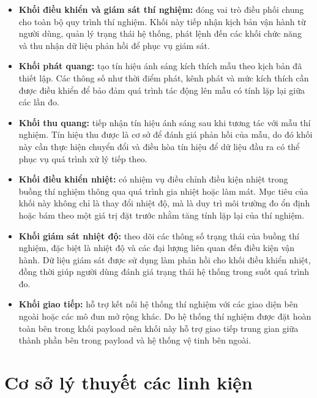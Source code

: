 \begin{itemize}
    \item \textbf{Khối điều khiển và giám sát thí nghiệm:} đóng vai trò điều phối chung cho toàn bộ quy trình thí nghiệm. Khối này tiếp nhận kịch bản vận hành từ người dùng, quản lý trạng thái hệ thống, phát lệnh đến các khối chức năng và thu nhận dữ liệu phản hồi để phục vụ giám sát.

    \item \textbf{Khối phát quang:} tạo tín hiệu ánh sáng kích thích mẫu theo kịch bản đã thiết lập. Các thông số như thời điểm phát, kênh phát và mức kích thích cần được điều khiển để bảo đảm quá trình tác động lên mẫu có tính lặp lại giữa các lần đo.

    \item \textbf{Khối thu quang:} tiếp nhận tín hiệu ánh sáng sau khi tương tác với mẫu thí nghiệm. Tín hiệu thu được là cơ sở để đánh giá phản hồi của mẫu, do đó khối này cần thực hiện chuyển đổi và điều hòa tín hiệu để dữ liệu đầu ra có thể phục vụ quá trình xử lý tiếp theo.

    \item \textbf{Khối điều khiển nhiệt:} có nhiệm vụ điều chỉnh điều kiện nhiệt trong buồng thí nghiệm thông qua quá trình gia nhiệt hoặc làm mát. Mục tiêu của khối này không chỉ là thay đổi nhiệt độ, mà là duy trì môi trường đo ổn định hoặc bám theo một giá trị đặt trước nhằm tăng tính lặp lại của thí nghiệm.

    \item \textbf{Khối giám sát nhiệt độ:} theo dõi các thông số trạng thái của buồng thí nghiệm, đặc biệt là nhiệt độ và các đại lượng liên quan đến điều kiện vận hành. Dữ liệu giám sát được sử dụng làm phản hồi cho khối điều khiển nhiệt, đồng thời giúp người dùng đánh giá trạng thái hệ thống trong suốt quá trình đo.

    \item \textbf{Khối giao tiếp:} hỗ trợ kết nối hệ thống thí nghiệm với các giao diện bên ngoài hoặc các mô đun mở rộng khác. Do hệ thống thí nghiệm được đặt hoàn toàn bên trong khối payload nên khối này hỗ trợ giao tiếp trung gian giữa thành phần bên trong payload và hệ thống vệ tinh bên ngoài.

\end{itemize}



\section{Cơ sở lý thuyết các linh kiện}

